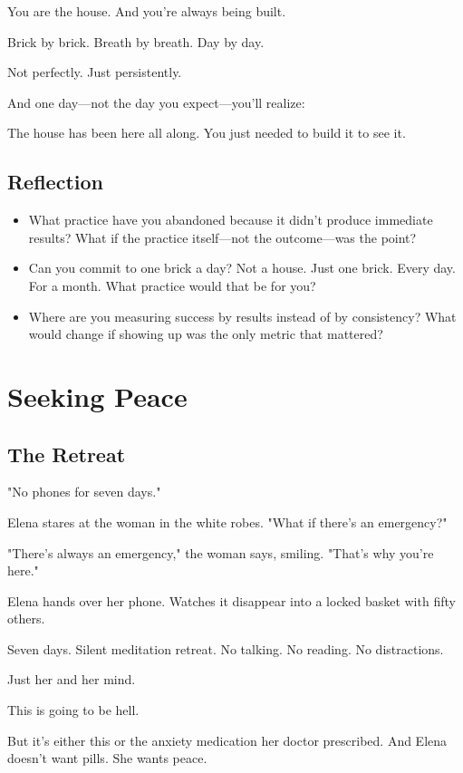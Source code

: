 \documentclass[11pt,twoside]{book}
\begin{document}
You are the house. And you're always being built.

Brick by brick. Breath by breath. Day by day.

Not perfectly. Just persistently.

And one day—not the day you expect—you'll realize:

The house has been here all along. You just needed to build it to see it.

\section*{Reflection}

\begin{itemize}
\item What practice have you abandoned because it didn't produce immediate results? What if the practice itself—not the outcome—was the point?
\item Can you commit to one brick a day? Not a house. Just one brick. Every day. For a month. What practice would that be for you?
\item Where are you measuring success by results instead of by consistency? What would change if showing up was the only metric that mattered?
\end{itemize}

\chapter{Seeking Peace}

\section*{The Retreat}

"No phones for seven days."

Elena stares at the woman in the white robes. "What if there's an emergency?"

"There's always an emergency," the woman says, smiling. "That's why you're here."

Elena hands over her phone. Watches it disappear into a locked basket with fifty others.

Seven days. Silent meditation retreat. No talking. No reading. No distractions.

Just her and her mind.

This is going to be hell.

But it's either this or the anxiety medication her doctor prescribed. And Elena doesn't want pills. She wants peace.
\end{document}
